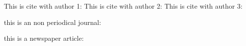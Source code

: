 \documentclass{article}
\begin{document}
This is cite with author 1:\cite{example1}
This is cite with author 2:\cite{example2}
This is cite with author 3:\cite{example3}

this is an non periodical journal:\cite{example4}


this is a newspaper article:\cite{example5}
\end{document}
